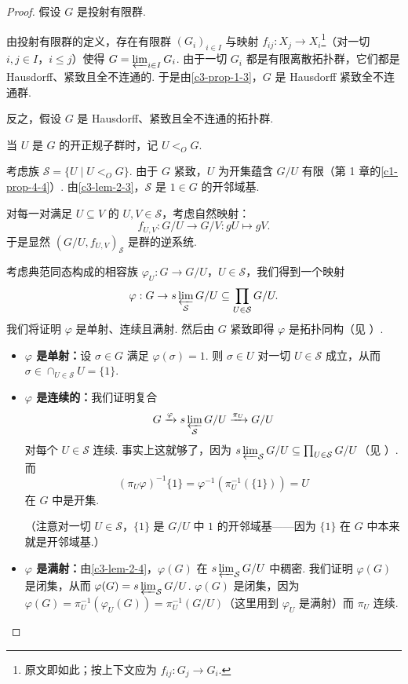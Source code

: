 \begin{proof}
假设 $G$ 是投射有限群.

由投射有限群的定义，存在有限群 $(G_i)_{i\in I}$ 与映射 $f_{ij}:X_j\to X_i$\footnote{原文即如此；按上下文应为 $f_{ij}:G_j\to G_i$.}（对一切 $i,j\in I$，$i\leq j$）使得 $G=\varprojlim_{i\in I}G_i$. 由于一切 $G_i$ 都是有限离散拓扑群，它们都是 Hausdorff、紧致且全不连通的. 于是由\autoref{c3-prop-1-3}，$G$ 是 Hausdorff 紧致全不连通群.

反之，假设 $G$ 是 Hausdorff、紧致且全不连通的拓扑群.

当 $U$ 是 $G$ 的开正规子群时，记 $U<_O G$.

考虑族 $\mathcal{S}=\{U\mid U<_O G\}$. 由于 $G$ 紧致，$U$ 为开集蕴含 $G/U$ 有限（第 1 章的\autoref{c1-prop-4-4}）. 由\autoref{c3-lem-2-3}，$\mathcal{S}$ 是 $1\in G$ 的开邻域基.

对每一对满足 $U\subseteq V$ 的 $U,V\in\mathcal{S}$，考虑自然映射：
\[
f_{U,V}:G/U\to G/V:gU\mapsto gV.
\]
于是显然 $(G/U,f_{U,V})_{\mathcal{S}}$ 是群的逆系统.

考虑典范同态构成的相容族 $\varphi_U:G\to G/U$，$U\in\mathcal{S}$，我们得到一个映射
\[
\varphi:G\to s\varprojlim_{\mathcal{S}}G/U\subseteq\prod_{U\in\mathcal{S}}G/U.
\]
我们将证明 $\varphi$ 是单射、连续且满射. 然后由 $G$ 紧致即得 $\varphi$ 是拓扑同构（见 \cite[Theorem~26.6]{mun75}）.
\begin{itemize}
    \item \textbf{$\varphi$ 是单射：}设 $\sigma\in G$ 满足 $\varphi(\sigma)=1$. 则 $\sigma\in U$ 对一切 $U\in\mathcal{S}$ 成立，从而 $\sigma\in\cap_{U\in\mathcal{S}}U=\{1\}$.
    \item \textbf{$\varphi$ 是连续的：}我们证明复合
    \[
    G\xrightarrow{\varphi}s\varprojlim_{\mathcal{S}}G/U\xrightarrow{\pi_U}G/U
    \]
    对每个 $U\in\mathcal{S}$ 连续. 事实上这就够了，因为 $s\varprojlim_{\mathcal{S}}G/U\subseteq\prod_{U\in\mathcal{S}}G/U$（见 \cite[Theorem~19.6]{mun75}）. 而
    \[
    (\pi_U\varphi)^{-1}\{1\}=\varphi^{-1}(\pi_U^{-1}(\{1\}))=U
    \]
    在 $G$ 中是开集.

    （注意对一切 $U\in\mathcal{S}$，$\{1\}$ 是 $G/U$ 中 $1$ 的开邻域基——因为 $\{1\}$ 在 $G$ 中本来就是开邻域基.）
    \item \textbf{$\varphi$ 是满射：}由\autoref{c3-lem-2-4}，$\varphi(G)$ 在 $s\varprojlim_{\mathcal{S}}G/U$ 中稠密. 我们证明 $\varphi(G)$ 是闭集，从而 $\varphi(G)=s\varprojlim_{\mathcal{S}}G/U$. $\varphi(G)$ 是闭集，因为 $\varphi(G)=\pi_U^{-1}(\varphi_U(G))=\pi_U^{-1}(G/U)$（这里用到 $\varphi_U$ 是满射）而 $\pi_U$ 连续.
\end{itemize}
\end{proof}

